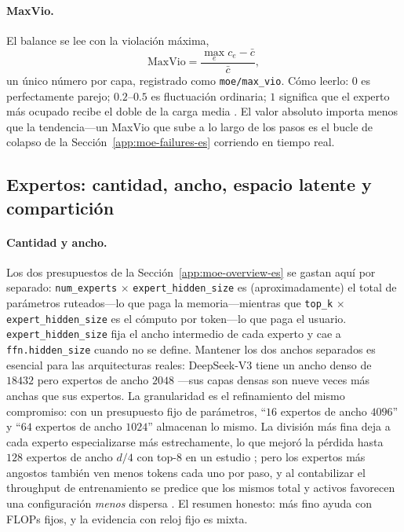 \paragraph{MaxVio.}
El balance se lee con la violación máxima,
\begin{equation}
  \mathrm{MaxVio} = \frac{\max_e c_e - \bar c}{\bar c},
\end{equation}
un único número por capa, registrado como \texttt{moe/max\_vio}. Cómo leerlo:
$0$ es perfectamente parejo; $0.2$--$0.5$ es fluctuación ordinaria; $1$
significa que el experto más ocupado recibe el doble de la carga media
\citep{wang2024auxfree}. El valor absoluto importa menos que la tendencia---un
MaxVio que sube a lo largo de los pasos es el bucle de colapso de la
Sección~\ref{app:moe-failures-es} corriendo en tiempo real.

\subsection{Expertos: cantidad, ancho, espacio latente y compartición}
\label{app:moe-experts-es}

\paragraph{Cantidad y ancho.}
Los dos presupuestos de la Sección~\ref{app:moe-overview-es} se gastan aquí por
separado: \texttt{num\_experts} $\times$ \texttt{expert\_hidden\_size} es
(aproximadamente) el total de parámetros ruteados---lo que paga la
memoria---mientras que \texttt{top\_k} $\times$ \texttt{expert\_hidden\_size}
es el cómputo por token---lo que paga el usuario.
\texttt{expert\_hidden\_size} fija el ancho intermedio de cada experto y cae a
\texttt{ffn.hidden\_size} cuando no se define. Mantener los dos anchos
separados es esencial para las arquitecturas reales: DeepSeek-V3 tiene un ancho
denso de $18432$ pero expertos de ancho $2048$ \citep{deepseek2024v3}---sus
capas densas son nueve veces más anchas que sus expertos. La granularidad es el
refinamiento del mismo compromiso: con un presupuesto fijo de parámetros,
``$16$ expertos de ancho $4096$'' y ``$64$ expertos de ancho $1024$''
almacenan lo mismo. La división más fina deja a cada experto especializarse más
estrechamente, lo que mejoró la pérdida hasta $128$ expertos de ancho $d/4$ con
top-8 en un estudio \citep{liew2026principled}; pero los expertos más angostos
también ven menos tokens cada uno por paso, y al contabilizar el throughput de
entrenamiento se predice que los mismos total y activos favorecen una
configuración \emph{menos} dispersa \citep{krajewski2025scaling}. El resumen
honesto: más fino ayuda con FLOPs fijos, y la evidencia con reloj fijo es
mixta.

